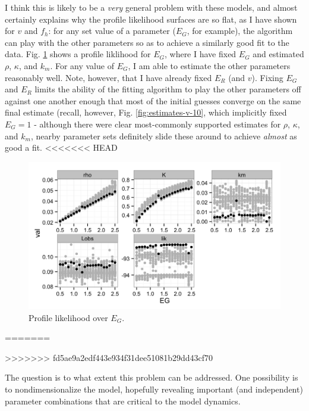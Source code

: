 \documentclass[12pt,reqno,final,pdftex]{amsart}\usepackage[]{graphicx}\usepackage[]{color}
\newenvironment{knitrout}{}{} %
\theoremstyle{plain}
\numberwithin{equation}{part}
\begin{document}
I think this is likely to be a \emph{very} general problem with these models, and almost certainly explains why the profile likelihood surfaces are so flat, as I have shown for $v$ and $f_h$: for any set value of a parameter ($E_G$, for example), the algorithm can play with the other parameters so as to achieve a similarly good fit to the data.
Fig. \ref{fig:profile-EG} shows a profile liklihood for $E_G$, where I have fixed $E_G$ and estimated $\rho$, $\kappa$, and $k_m$.
For any value of $E_G$, I am able to estimate the other parameters reasonably well.
Note, however, that I have already fixed $E_R$ (and $v$).
Fixing $E_G$ and $E_R$ limits the ability of the fitting algorithm to play the other parameters off against one another enough that most of the initial guesses converge on the same final estimate (recall, however, Fig. \ref{fig:estimates-v-10}, which implicitly fixed $E_G=1$ - although there were clear most-commonly supported estimates for $\rho$, $\kappa$, and $k_m$, nearby parameter sets definitely slide these around to achieve \emph{almost} as good a fit.
<<<<<<< HEAD
\begin{knitrout}\scriptsize
{}\color{fgcolor}\begin{figure}

\includegraphics[width=\linewidth]{figure/profile-EG-1} \hfill{}

\caption[Profile likelihood over ]{Profile likelihood over $E_G$.}\label{fig:profile-EG}
\end{figure}


\end{knitrout}
=======

>>>>>>> fd5ae9a2edf443e934f31dee51081b29dd43cf70

The question is to what extent this problem can be addressed.
One possibility is to nondimensionalize the model, hopefully revealing important (and independent) parameter combinations that are critical to the model dynamics.
\end{document}
